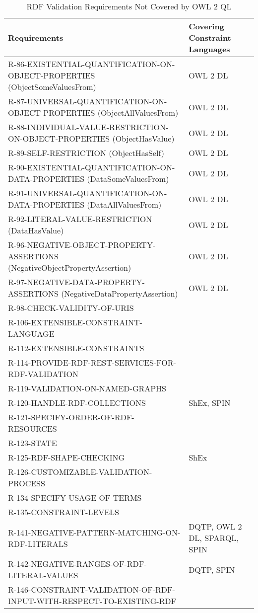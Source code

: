 \documentclass{llncs}
\newcommand{\hr}{\hline\noalign{\smallskip}} %
\begin{document}
\begin{table}
\caption{RDF Validation Requirements Not Covered by OWL 2 QL}
\label{tab:RequirementsNotCoveredOWL2QL-3}
\centering
\begin{tabular}{ll}
\hr
Requirements & Covering Constraint Languages \\
\hr
R-86-EXISTENTIAL-QUANTIFICATION-ON-OBJECT-PROPERTIES (ObjectSomeValuesFrom) & OWL 2 DL \\
R-87-UNIVERSAL-QUANTIFICATION-ON-OBJECT-PROPERTIES (ObjectAllValuesFrom) & OWL 2 DL \\
R-88-INDIVIDUAL-VALUE-RESTRICTION-ON-OBJECT-PROPERTIES (ObjectHasValue) & OWL 2 DL \\
R-89-SELF-RESTRICTION (ObjectHasSelf) & OWL 2 DL \\
R-90-EXISTENTIAL-QUANTIFICATION-ON-DATA-PROPERTIES (DataSomeValuesFrom) & OWL 2 DL \\
R-91-UNIVERSAL-QUANTIFICATION-ON-DATA-PROPERTIES (DataAllValuesFrom) & OWL 2 DL \\
R-92-LITERAL-VALUE-RESTRICTION (DataHasValue) & OWL 2 DL \\
R-96-NEGATIVE-OBJECT-PROPERTY-ASSERTIONS (NegativeObjectPropertyAssertion) & OWL 2 DL \\
R-97-NEGATIVE-DATA-PROPERTY-ASSERTIONS (NegativeDataPropertyAssertion) & OWL 2 DL \\
R-98-CHECK-VALIDITY-OF-URIS & \\
R-106-EXTENSIBLE-CONSTRAINT-LANGUAGE & \\
R-112-EXTENSIBLE-CONSTRAINTS & \\
R-114-PROVIDE-RDF-REST-SERVICES-FOR-RDF-VALIDATION & \\
R-119-VALIDATION-ON-NAMED-GRAPHS & \\
R-120-HANDLE-RDF-COLLECTIONS & ShEx, SPIN \\
R-121-SPECIFY-ORDER-OF-RDF-RESOURCES & \\
R-123-STATE & \\
R-125-RDF-SHAPE-CHECKING & ShEx \\
R-126-CUSTOMIZABLE-VALIDATION-PROCESS & \\
R-134-SPECIFY-USAGE-OF-TERMS & \\
R-135-CONSTRAINT-LEVELS & \\
R-141-NEGATIVE-PATTERN-MATCHING-ON-RDF-LITERALS & DQTP, OWL 2 DL, SPARQL, SPIN \\
R-142-NEGATIVE-RANGES-OF-RDF-LITERAL-VALUES & DQTP, SPIN \\
R-146-CONSTRAINT-VALIDATION-OF-RDF-INPUT-WITH-RESPECT-TO-EXISTING-RDF & \\

\end{tabular}
\end{table}
\end{document}

